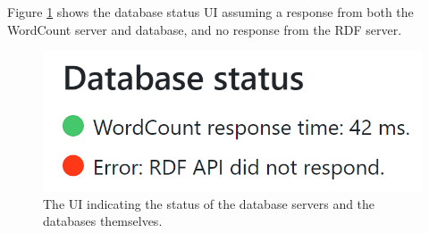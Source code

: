 Figure \ref{dbstatusUI} shows the database status UI assuming a response from both the WordCount server and database, and no response from the RDF server.
\begin{figure}[htb!]
    \centering
    \includegraphics[scale=0.5]{Images/dbstatus.png}
    \caption{The UI indicating the status of the database servers and the databases themselves.}
    \label{dbstatusUI}
\end{figure}
